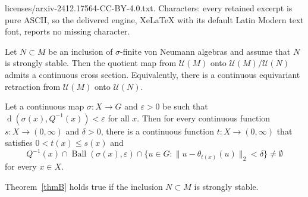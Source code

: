 \documentclass[10pt,a4paper]{amsart}
\DeclareMathOperator{\Ball}{Ball}
\DeclareMathOperator{\dist}{d}
\newcommand{\cU}{\mathcal{U}}
\newcommand{\ve}{\varepsilon}
\begin{document}
licenses/arxiv-2412.17564-CC-BY-4.0.txt. Characters: every retained excerpt is pure ASCII, so the delivered engine, XeLaTeX with its default Latin Modern text font, reports no missing character.
\begin{thmA}\label{thmB}
Let $N\subset M$ be an inclusion of $\sigma$-finite 
von Neumann algebras and assume 
that $N$ is strongly stable. 
Then the quotient map from $\mathcal{U}(M)$ 
onto $\mathcal{U}(M)/\mathcal{U}(N)$ 
admits a continuous cross section. 
Equivalently, there is a continuous equivariant retraction 
from $\cU(M)$ onto $\cU(N)$.
\end{thmA}

\begin{lem}\label{lem:selection3}
Let a continuous map $\sigma\colon X\to G$ 
and $\ve>0$ be such that 
$\dist(\sigma(x),Q^{-1}(x))<\ve$ for all $x$. 
Then for every continuous function $s\colon X\to(0,\infty)$ 
and $\delta>0$, 
there is a continuous function $t\colon X\to (0,\infty)$ 
that satisfies $0<t(x)\le s(x)$ and 
\[
Q^{-1}(x)\cap\Ball(\sigma(x),\ve)
 \cap \{ u\in G : \| u - \theta_{t(x)}(u) \|_2<\delta\}
 \neq \emptyset
\]
for every $x\in X$.
\end{lem}

\begin{lem}\label{lem:pre}
Theorem~\ref{thmB} holds true if the inclusion $N\subset M$ 
is strongly stable.
\end{lem}
\end{document}
